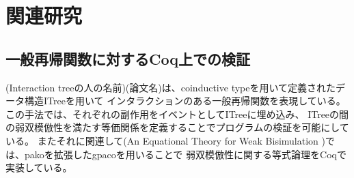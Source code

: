 \documentclass[japanese]{jssst_ppl}
\theoremstyle{definition}
\begin{document}
  \iffalse
    \begin{verbatim}
  |《 rewrite under cnew mlint 1 >>= by bindfwB》|
  factdts_aux n a >> (cget a >>= [eta Ret])
  |《 fixpointE 》|
  cget a >>=
  (fun x : coq_type N ml_int => (cput a (fact n * x) >> Ret tt) >> (cget a >>= [eta Ret]))
  |《 rewrite under cget a >>= by eqbind》|
  (cput a (fact n * x) >> Ret tt) >> (cget a >>= [eta Ret])
  |《 fixpointE 》|
  cput a (fact n * x) >> (cget a >>= [eta Ret])
  |《 over 》|
  cnew ml_int 1 >>=
  (fun a : loc ml_int =>
   cget a >>=
   (fun x : coq_type N ml_int => cput a (fact n * x) >> (cget a >>= [eta Ret])))
   |《 fixpointE 》|
   cnew ml_int (fact n) >>= (fun r : loc ml_int => cget r >>= [eta Ret])

\end{verbatim}
  \fi

  \iffalse
    |《 rewrite under cnew ml_int 1 >>= by bindfwB》|
    factdts_aux n a >> (cget a >>= [eta Ret])
    |《 fixpointE 》|
    cget a >>=
    (fun x : coq_type N ml_int => (cput a (fact n * x) >> Ret tt) >> (cget a >>= [eta Ret]))
    |《 rewrite under cget a >>= by eq_bind》|
    (cput a (fact n * x) >> Ret tt) >> (cget a >>= [eta Ret])
    |《 fixpointE 》|
    cput a (fact n * x) >> (cget a >>= [eta Ret])
    |《 over 》|
    cnew ml_int 1 >>=
    (fun a : loc ml_int =>
    cget a >>=
    (fun x : coq_type N ml_int => cput a (fact n * x) >> (cget a >>= [eta Ret])))
    |《 fixpointE 》|
    cnew ml_int (fact n) >>= (fun r : loc ml_int => cget r >>= [eta Ret])

  \fi
\fi

\section{関連研究}
\subsection{一般再帰関数に対するCoq上での検証}
(Interaction treeの人の名前)(論文名)は、coinductive typeを用いて定義されたデータ構造ITreeを用いて
インタラクションのある一般再帰関数を表現している。この手法では、それぞれの副作用をイベントとしてITreeに埋め込み、
ITreeの間の弱双模倣性を満たす等価関係を定義することでプログラムの検証を可能にしている。
またそれに関連して(An Equational Theory for Weak Bisimulation )では、pakoを拡張したgpacoを用いることで
弱双模倣性に関する等式論理をCoqで実装している。

\end{document}

